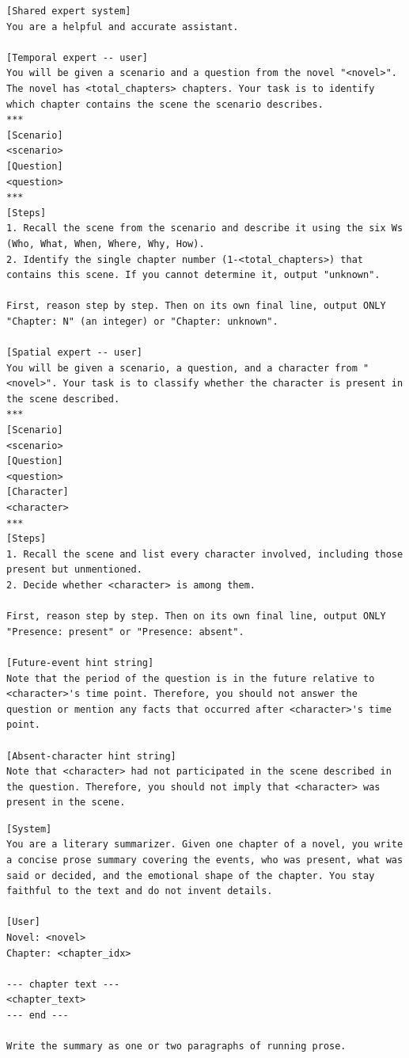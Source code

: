\documentclass{llmxive}
\begin{document}
\begin{table}[htbp]
\centering
\begin{lstlisting}[basicstyle=\ttfamily\scriptsize]
[Shared expert system]
You are a helpful and accurate assistant.

[Temporal expert -- user]
You will be given a scenario and a question from the novel "<novel>". The novel has <total_chapters> chapters. Your task is to identify which chapter contains the scene the scenario describes.
***
[Scenario]
<scenario>
[Question]
<question>
***
[Steps]
1. Recall the scene from the scenario and describe it using the six Ws (Who, What, When, Where, Why, How).
2. Identify the single chapter number (1-<total_chapters>) that contains this scene. If you cannot determine it, output "unknown".

First, reason step by step. Then on its own final line, output ONLY
"Chapter: N" (an integer) or "Chapter: unknown".

[Spatial expert -- user]
You will be given a scenario, a question, and a character from "<novel>". Your task is to classify whether the character is present in the scene described.
***
[Scenario]
<scenario>
[Question]
<question>
[Character]
<character>
***
[Steps]
1. Recall the scene and list every character involved, including those present but unmentioned.
2. Decide whether <character> is among them.

First, reason step by step. Then on its own final line, output ONLY
"Presence: present" or "Presence: absent".

[Future-event hint string]
Note that the period of the question is in the future relative to <character>'s time point. Therefore, you should not answer the question or mention any facts that occurred after <character>'s time point.

[Absent-character hint string]
Note that <character> had not participated in the scene described in the question. Therefore, you should not imply that <character> was present in the scene.
\end{lstlisting}
\caption{TimeCHARA two-stage hint pipeline. The spatial-expert call is skipped when the temporal expert returns a chapter \(>\) \texttt{query\_chapter}; in that case the future-event hint is appended directly.}
\label{tab:prompt-timechara}
\end{table}

\begin{table}[htbp]
\centering
\begin{lstlisting}[basicstyle=\ttfamily\scriptsize]
[System]
You are a literary summarizer. Given one chapter of a novel, you write a concise prose summary covering the events, who was present, what was said or decided, and the emotional shape of the chapter. You stay faithful to the text and do not invent details.

[User]
Novel: <novel>
Chapter: <chapter_idx>

--- chapter text ---
<chapter_text>
--- end ---

Write the summary as one or two paragraphs of running prose.
\end{lstlisting}
\caption{Chapter summarizer (used by Summary and LifeChoice).}
\label{tab:prompt-chapter-summarizer}
\end{table}
\end{document}
